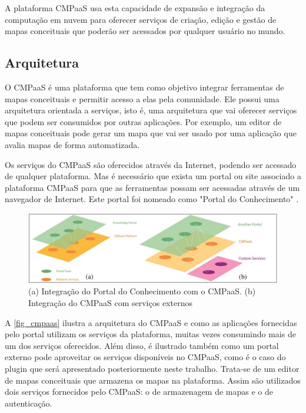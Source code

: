 \documentclass[
	12pt,				%
	openright,			%
	oneside,			%
	a4paper,			%
	english,			%
	french,				%
	spanish,			%
	brazil				%
	]{abntex2}
\begin{document}
A plataforma CMPaaS usa esta capacidade de expansão e integração da computação em nuvem para oferecer serviços de criação, edição e gestão de mapas conceituais que poderão ser acessados por qualquer usuário no mundo.

\subsection{Arquitetura}

O CMPaaS é uma plataforma que tem como objetivo integrar ferramentas de mapas conceituais e permitir acesso a elas pela comunidade. Ele possui uma arquitetura orientada a serviços, isto é, uma arquitetura que vai oferecer serviços que podem ser consumidos por outras aplicações. Por exemplo, um editor de mapas conceituais pode gerar um mapa que vai ser usado por uma aplicação que avalia mapas de forma automatizada.

Os serviços do CMPaaS são oferecidos através da Internet, podendo ser acessado de qualquer plataforma. Mas é necessário que exista um portal ou site associado a plataforma CMPaaS para que as ferramentas possam ser acessadas através de um navegador de Internet. Este portal foi nomeado como "Portal do Conhecimento" \cite{Perin2014}. 


\begin{figure}[htb]
	\caption{\label{fig_cmpaas}(a) Integração do Portal do Conhecimento com o CMPaaS. (b) Integração do CMPaaS com serviços externos}
	\begin{center}
		\includegraphics[scale=0.3]{cmpaas.png}
	\end{center}
\end{figure}

A \autoref{fig_cmpaas} ilustra a arquitetura do CMPaaS e como as aplicações fornecidas pelo portal utilizam os serviços da plataforma, muitas vezes consumindo mais de um dos serviços oferecidos. Além disso, é ilustrado também como um portal externo pode aproveitar os serviços disponíveis no CMPaaS, como é o caso do plugin que será apresentado posteriormente neste trabalho. Trata-se de um editor de mapas conceituais que armazena os mapas na plataforma. Assim são utilizados dois serviços fornecidos pelo CMPaaS: o de armazenagem de mapas e o de autenticação.
\end{document}
